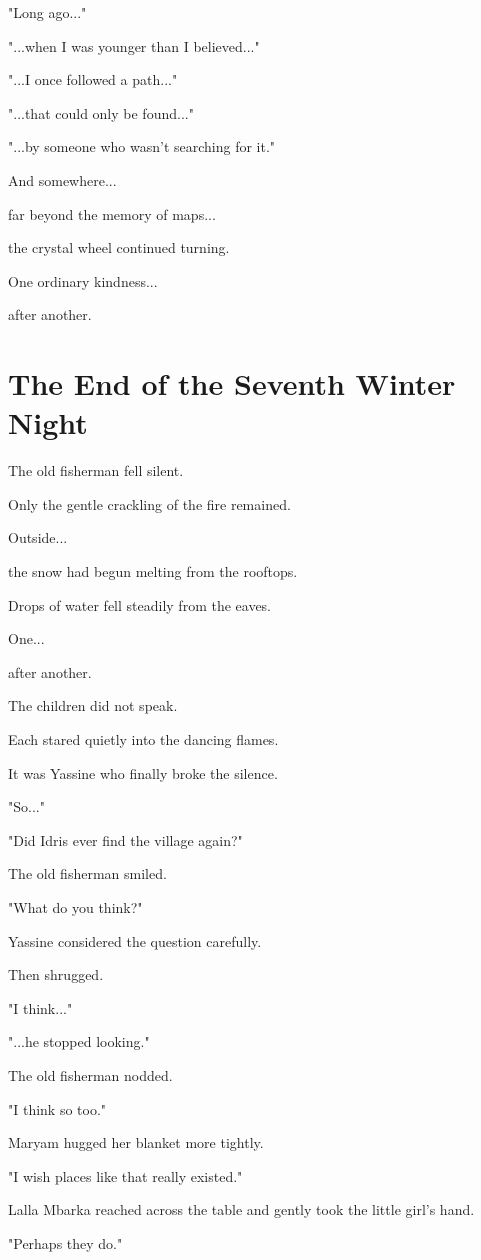 \documentclass[12pt,openany]{book}
\begin{document}
"Long ago..."

"...when I was younger than I believed..."

"...I once followed a path..."

"...that could only be found..."

"...by someone who wasn't searching for it."

And somewhere...

far beyond the memory of maps...

the crystal wheel continued turning.

One ordinary kindness...

after another.
\section*{The End of the Seventh Winter Night}

The old fisherman fell silent.

Only the gentle crackling of the fire remained.

Outside...

the snow had begun melting from the rooftops.

Drops of water fell steadily from the eaves.

One...

after another.

The children did not speak.

Each stared quietly into the dancing flames.

It was Yassine who finally broke the silence.

"So..."

"Did Idris ever find the village again?"

The old fisherman smiled.

"What do you think?"

Yassine considered the question carefully.

Then shrugged.

"I think..."

"...he stopped looking."

The old fisherman nodded.

"I think so too."

Maryam hugged her blanket more tightly.

"I wish places like that really existed."

Lalla Mbarka reached across the table and gently took the little girl's hand.

"Perhaps they do."
\end{document}
